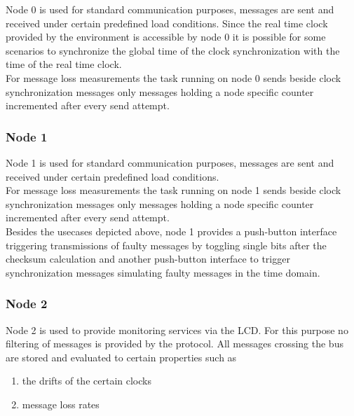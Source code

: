 Node 0 is used for standard communication purposes, messages are sent and received under certain predefined load conditions. Since the real time clock provided by the environment is
accessible by node 0 it is possible for some scenarios to synchronize the global time of the clock synchronization with the time of the real time clock.\\

For message loss measurements the task running on node 0 sends beside clock synchronization messages only messages holding a node specific counter incremented after every send attempt.\\ 

\subsubsection{Node 1}
\label{sec:app:specification:node1}

Node 1 is used for standard communication purposes, messages are sent and received under certain predefined load conditions.\\

For message loss measurements the task running on node 1 sends beside clock synchronization messages only messages holding 
a node specific counter incremented after every send attempt.\\ 

Besides the usecases depicted above, node 1 provides a push-button interface triggering transmissions of faulty messages 
by toggling single bits after the checksum calculation and another push-button interface to trigger synchronization messages 
simulating faulty messages in the time domain.\\

\subsubsection{Node 2}
\label{sec:app:specification:node2}

Node 2 is used to provide monitoring services via the LCD. For this purpose no filtering of messages is provided by the protocol.
All messages crossing the bus are stored and evaluated to certain properties such as

\begin{enumerate}
 \item the drifts of the certain clocks
 \item message loss rates
\end{enumerate}

